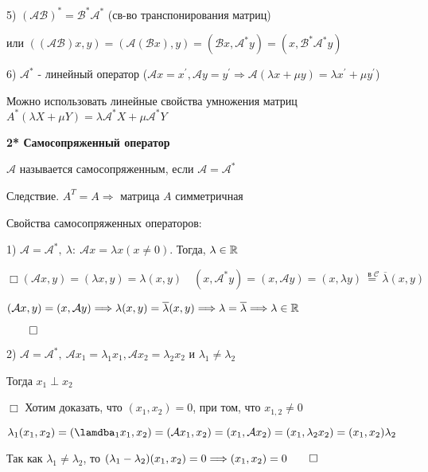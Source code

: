 \documentclass[12pt]{article}
\begin{document}
    5) $\displaystyle (\mathcal{A}\mathcal{B})^* = \mathcal{B}^* \mathcal{A}^*$ (св-во транспонирования матриц)

    или $\displaystyle ((\mathcal{AB})x, y) = (\mathcal{A}(\mathcal{B}x), y) = (\mathcal{B}x, \mathcal{A}^* y) = (x, \mathcal{B}^* \mathcal{A}^* y)$

    6) $\displaystyle \mathcal{A}^*$ - линейный оператор ($\displaystyle \mathcal{A}x = x^\prime, \mathcal{A}y = y^\prime \Longrightarrow \mathcal{A}(\lambda x + \mu y) = \lambda x^\prime + \mu y^\prime$)

    Можно использовать линейные свойства умножения матриц $\displaystyle A^* (\lambda X + \mu Y) = \lambda \mathcal{A}^* X + \mu \mathcal{A}^* Y$

    \textbf{2* Самосопряженный оператор}

    \Def $\mathcal{A}$ называется самосопряженным, если $\displaystyle \mathcal{A} = \mathcal{A}^*$

    Следствие. $\displaystyle A^T = A \Longrightarrow$ матрица $A$ симметричная

    Свойства самосопряженных операторов:

    1) $\displaystyle \mathcal{A} = \mathcal{A}^*, \ \lambda : \ \mathcal{A}x = \lambda x (x \neq 0)$. Тогда, $\lambda \in \mathbb{R}$

    $\displaystyle \Box (\mathcal{A}x, y) = (\lambda x, y) = \lambda (x, y) \quad (x, \mathcal{A}^* y) = (x, \mathcal{A}y) = (x, \lambda y) \stackrel{\text{ в } \mathcal{C}}{=} \overline{\lambda} (x, y)$

    $(\mathcal{A}x, y) = (x, \mathcal{A}y) \Longrightarrow \lambda (x, y) = \overline{\lambda} (x, y) \Longrightarrow \lambda = \overline{\lambda} \Longrightarrow \lambda \in \mathbb{R}$

    $\qed$

    2) $\displaystyle \mathcal{A} = \mathcal{A}^*, \ \mathcal{A}x_1 = \lambda_1 x_1, \mathcal{A}x_2 = \lambda_2 x_2$ и $\displaystyle \lambda_1 \neq \lambda_2$

    Тогда $\displaystyle x_1 \perp x_2$

    $\Box$ Хотим доказать, что $\displaystyle (x_1, x_2) = 0$, при том, что $\displaystyle x_{1,2} \neq 0$

    $\displaystyle \lambda_1 (x_1, x_2) = (\lamdba_1 x_1, x_2) = (\mathcal{A} x_1, x_2) = (x_1, \mathcal{A} x_2) = (x_1, \lambda_2 x_2) = (x_1, x_2) \lambda_2$

    Так как $\displaystyle \lambda_1 \neq \lambda_2$, то $\displaystyle (\lambda_1 - \lambda_2) (x_1, x_2) = 0 \Longrightarrow (x_1, x_2) = 0 \qed$
\end{document}
